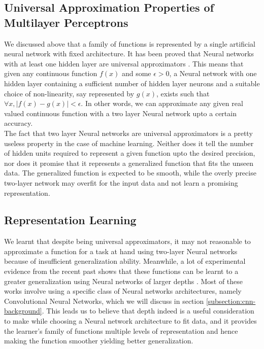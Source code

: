 \subsection*{Universal Approximation Properties of Multilayer Perceptrons}
\label{subsection:universal-approx}
We discussed above that a family of functions is represented by a single 
artificial neural network with fixed architecture. It has been proved that 
Neural networks with at least one hidden layer are universal 
approximators \cite{hornik1989multilayer}. This means that given any continuous 
function $f(x)$ and some $\epsilon>0$, a Neural network with one hidden layer 
containing a sufficient number of hidden layer neurons and a suitable choice of 
non-linearity, say represented by $g(x)$, exists such that $\forall x, 
|f(x)-g(x)|<\epsilon$. In other words, we can approximate any given real 
valued continuous function with a two layer Neural network upto a certain 
accuracy.\\

The fact that two layer Neural networks are universal approximators 
is a pretty useless property in the case of machine learning. Neither does it 
tell the number of hidden units required to represent a given function upto the 
desired precision, nor does it promise that it represents a generalized function 
that fits the unseen data. The generalized function is expected to be smooth, 
while the overly precise two-layer network may overfit for the input data and 
not learn a promising representation.

\subsection*{Representation Learning}
We learnt that despite being universal approximators, it may not reasonable to 
approximate a function for a task at hand using two-layer Neural networks 
because of insufficient generalization ability. Meanwhile, a lot of 
experimental evidence from the recent past shows that these functions can be 
learnt to a greater generalization using Neural networks of larger depths 
\cite{bengio-dl-book}. Most of these works involve using a specific class of 
Neural networks architectures, namely Convolutional Neural Networks, which we 
will discuss in section \ref{subsection:cnn-background}. This leads us to 
believe that depth indeed is a useful consideration to make while choosing a 
Neural network architecture to fit data, and it provides the learner's family 
of functions multiple levels of representation and hence making the function 
smoother yielding better generalization. 

